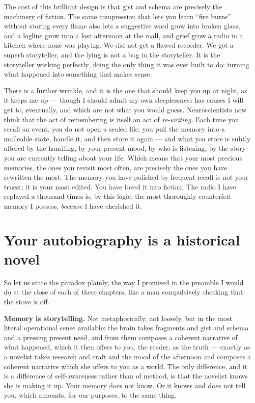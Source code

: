 The cost of this brilliant design is that gist and schema are precisely the machinery of fiction. The same compression that lets you learn ``fire burns'' without storing every flame also lets a suggestive word grow into broken glass, and a logline grow into a lost afternoon at the mall, and grief grow a radio in a kitchen where none was playing. We did not get a flawed recorder. We got a superb storyteller, and the lying is not a bug in the storyteller. It is the storyteller working perfectly, doing the only thing it was ever built to do: turning what happened into something that makes sense.

There is a further wrinkle, and it is the one that should keep you up at night, as it keeps me up — though I should admit my own sleeplessness has causes I will get to, eventually, and which are not what you would guess. Neuroscientists now think that the act of remembering is itself an act of \emph{re-writing.} Each time you recall an event, you do not open a sealed file; you pull the memory into a malleable state, handle it, and then store it again — and what you store is subtly altered by the handling, by your present mood, by who is listening, by the story you are currently telling about your life. Which means that your most precious memories, the ones you revisit most often, are precisely the ones you have rewritten the most. The memory you have polished by frequent recall is not your truest; it is your most edited. You have loved it into fiction. The radio I have replayed a thousand times is, by this logic, the most thoroughly counterfeit memory I possess, \emph{because} I have cherished it.

\section*{Your autobiography is a historical novel}

So let us state the paradox plainly, the way I promised in the preamble I would do at the close of each of these chapters, like a man compulsively checking that the stove is off.

\textbf{Memory is storytelling.} Not metaphorically, not loosely, but in the most literal operational sense available: the brain takes fragments and gist and schema and a pressing present need, and from them composes a coherent narrative of what happened, which it then offers to you, the reader, as the truth — exactly as a novelist takes research and craft and the mood of the afternoon and composes a coherent narrative which she offers to you as a world. The only difference, and it is a difference of self-awareness rather than of method, is that the novelist knows she is making it up. Your memory does not know. Or it knows and does not tell you, which amounts, for our purposes, to the same thing.

